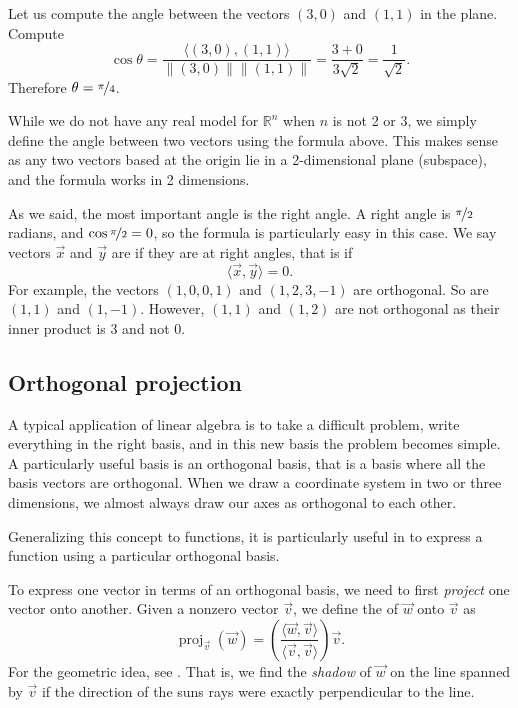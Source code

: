 \begin{example}
Let us compute the angle between the vectors $(3,0)$ and $(1,1)$ in the
plane.
Compute
\begin{equation*}
\cos \theta =
\frac{\bigl\langle (3,0) , (1,1) \bigr\rangle}{\lVert(3,0)\rVert \lVert(1,1)\rVert}
=
\frac{3 + 0}{3 \sqrt{2}} = \frac{1}{\sqrt{2}} .
\end{equation*}
Therefore $\theta = \nicefrac{\pi}{4}$.
\end{example}

While we do not have any real model for ${\mathbb{R}}^n$ when $n$ is not 2
or 3, 
we simply define the angle between two vectors using the formula above.
This makes sense as any two vectors based at the origin
lie in a 2-dimensional plane (subspace),
and the formula works in 2 dimensions.

\medskip

As we said, the most important angle is the right angle.  A right angle
is $\nicefrac{\pi}{2}$ radians, and $\cos \nicefrac{\pi}{2} = 0$, so the
formula is particularly easy in this case.
We say
vectors $\vec{x}$ and $\vec{y}$
are \emph{} if they are at right
angles, that is if
\begin{equation*}
\langle \vec{x} , \vec{y} \rangle
=
0 .
\end{equation*}
For example, the vectors $(1,0,0,1)$ and $(1,2,3,-1)$ are orthogonal.  So
are $(1,1)$ and $(1,-1)$.  However, $(1,1)$ and $(1,2)$ are not orthogonal as
their inner product is $3$ and not 0.

\subsection{Orthogonal projection}

A typical application of linear algebra is to take a difficult problem,
write everything in the right basis, and in this new basis the problem
becomes simple.  A particularly useful basis is an orthogonal basis, that is
a basis where all the basis vectors are orthogonal.  When we draw a
coordinate system in two or three dimensions, we almost always draw our axes
as orthogonal to each other.

Generalizing this concept to functions,
it is particularly useful in  to express a
function using a particular orthogonal basis.

To express one vector in terms of an orthogonal basis, we need to first
\emph{project} one vector onto another.
Given a nonzero vector $\vec{v}$, we define the
\emph{}
of $\vec{w}$ onto $\vec{v}$ as
\begin{equation*}
\operatorname{proj}_{\vec{v}}(\vec{w})
=
\left(
\frac{\langle \vec{w} , \vec{v} \rangle}{ \langle \vec{v} , \vec{v} \rangle}
\right)
\vec{v} .
\end{equation*}
For the geometric idea, see .  That is, we
find the \emph{shadow} of $\vec{w}$ on the line spanned by $\vec{v}$ if the
direction of the suns rays
were exactly perpendicular to the line. 

